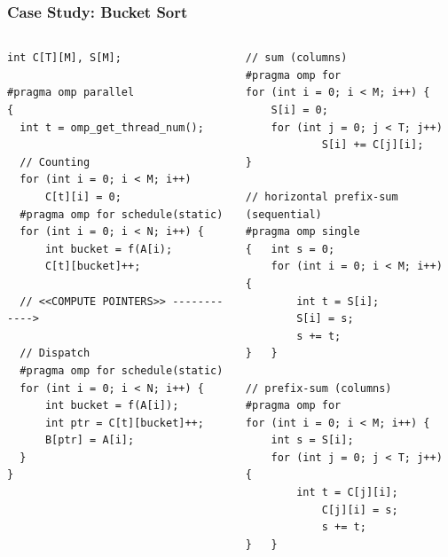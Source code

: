 \documentclass[xcolor={x11names,svgnames},x11names,svgnames]{beamer}
\begin{document}
\begin{frame}[label=radix_noconflict_table]
  \end{frame}


\begin{frame}[label=radix_code, fragile]
  \frametitle{Case Study: Bucket Sort}

  \begin{columns}
    \begin{column}{0.5\textwidth}
\begin{verbatim}
int C[T][M], S[M];

#pragma omp parallel
{
  int t = omp_get_thread_num();

  // Counting
  for (int i = 0; i < M; i++)
      C[t][i] = 0;
  #pragma omp for schedule(static)
  for (int i = 0; i < N; i++) {
      int bucket = f(A[i);
      C[t][bucket]++;

  // <<COMPUTE POINTERS>> ------------>

  // Dispatch
  #pragma omp for schedule(static)
  for (int i = 0; i < N; i++) {
      int bucket = f(A[i]);
      int ptr = C[t][bucket]++;
      B[ptr] = A[i];
  }
}
\end{verbatim}
    \end{column}  

    \begin{column}{5.8cm}
      \vspace{-0.7cm}
      \begin{verbatim}
// sum (columns)
#pragma omp for
for (int i = 0; i < M; i++) {
    S[i] = 0;
    for (int j = 0; j < T; j++)
            S[i] += C[j][i];
}

// horizontal prefix-sum (sequential)
#pragma omp single
{   int s = 0;
    for (int i = 0; i < M; i++) {
        int t = S[i];
        S[i] = s;
        s += t;
}   }

// prefix-sum (columns)
#pragma omp for
for (int i = 0; i < M; i++) {
    int s = S[i];
    for (int j = 0; j < T; j++) {
        int t = C[j][i];
            C[j][i] = s;
            s += t;
}   }
\end{verbatim}
    \end{column}
  \end{columns}
\end{frame}
\end{document}
